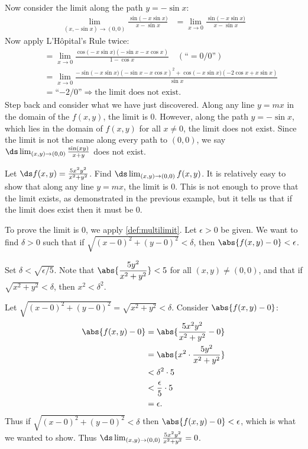 \begin{example}
\begin{enumerate}
	Now consider the limit along the path $y=-\sin x$:
	\begin{align*}
	\lim_{(x,-\sin x)\to (0,0)} \frac{\sin\bigl(-x\sin x\bigr)}{x-\sin x} &= \lim_{x\to0} \frac{\sin\bigl(-x\sin x\bigr)}{x-\sin x}
	\end{align*}
	Now apply L'Hôpital's Rule twice:
	\small
	\begin{align*}
	 \quad &= \lim_{x\to 0}\frac{\cos\bigl(-x\sin x\bigr)(-\sin x-x\cos x)}{1-\cos x} \quad \left(\text{``}= 0/0\text{''}\right)\\
	&= \lim_{x\to 0}\frac{-\sin\bigl(-x\sin x\bigr)(-\sin x-x\cos x)^2+\cos\bigl(-x\sin x\bigr)(-2\cos x+x\sin x)}{\sin x}\\
	&= \text{``$-2/0$''} \Rightarrow \text{the limit does not exist.}
	\end{align*}
	\normalsize
Step back and consider what we have just discovered. Along any line $y=mx$ in the domain of the $f(x,y)$, the limit is 0. However, along the path $y=-\sin x$, which lies in the domain of  $f(x,y)$ for all $x\neq 0$, the limit does not exist. Since the limit is not the same along every path to $(0,0)$, we say $\ds \lim_{(x,y)\to (0,0)}\frac{\sin(xy)}{x+y}$ does not exist.
\end{enumerate}
\end{example}

\begin{example}\label{ex_multilimit5}%
Let $\ds f(x,y) = \frac{5x^2y^2}{x^2+y^2}$. Find $\ds\lim_{(x,y)\to (0,0)}  f(x,y)$.
\solution
It is relatively easy to show that along any line $y=mx$, the limit is 0. This is not enough to prove that the limit exists, as demonstrated in the previous example, but it tells us that if the limit does exist then it must be 0.

To prove the limit is 0, we apply \autoref{def:multilimit}. Let $\epsilon >0$ be given. We want to find $\delta >0$ such that if $\sqrt{(x-0)^2+(y-0)^2} <\delta$, then $\abs{f(x,y)-0}<\epsilon$.

Set $\delta < \sqrt{\epsilon/5}$. Note that $\abs{\dfrac{5y^2}{x^2+y^2}}<5$ for all $(x,y)\neq (0,0)$, and that if $\sqrt{x^2+y^2} <\delta$, then $x^2<\delta^2$.

Let $\sqrt{(x-0)^2+(y-0)^2} = \sqrt{x^2+y^2}<\delta$. Consider $\abs{f(x,y)-0}$:
{\allowdisplaybreaks
\begin{align*}
\abs{f(x,y)-0}&= \abs{\frac{5x^2y^2}{x^2+y^2}-0} \\
				&= \abs{x^2\cdot\frac{5y^2}{x^2+y^2}}\\
				&< \delta^2\cdot 5 \\
				&< \frac{\epsilon}{5}\cdot 5 \\
				&= \epsilon.
\end{align*}}
Thus if $\sqrt{(x-0)^2+(y-0)^2}<\delta$ then $\abs{f(x,y)-0}<\epsilon$, which is what we wanted to show. Thus $\ds \lim_{(x,y)\to(0,0)} \frac{5x^2y^2}{x^2+y^2} = 0$.
\end{example}

